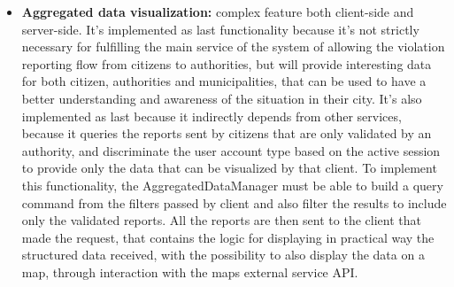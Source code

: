 \begin{itemize}
	\item \textbf{Aggregated data visualization:} complex feature both client-side and server-side. It's implemented as last functionality because it's not strictly necessary for fulfilling the main service of the system of allowing the violation reporting flow from citizens to authorities, but will provide interesting data for both citizen, authorities and municipalities, that can be used to have a better understanding and awareness of the situation in their city. It's also implemented as last because it indirectly depends from other services, because it queries the reports sent by citizens that are only validated by an authority, and discriminate the user account type based on the active session to provide only the data that can be visualized by that client. To implement this functionality, the AggregatedDataManager must be able to build a query command from the filters passed by client and also filter the results to include only the validated reports. All the reports are then sent to the client that made the request, that contains the logic for displaying in practical way the structured data received, with the possibility to also display the data on a map, through interaction with the maps external service API.
\end{itemize}